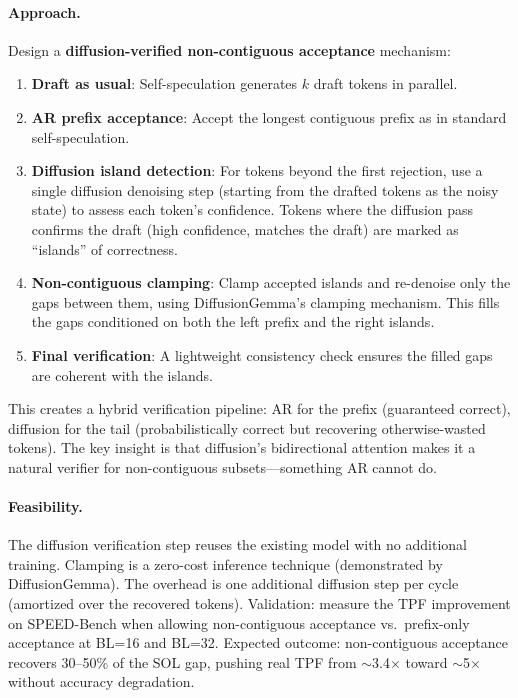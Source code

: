 \documentclass[11pt,a4paper]{article}
\begin{document}
\paragraph{Approach.} Design a \textbf{diffusion-verified non-contiguous acceptance} mechanism:
\begin{enumerate}
\item \textbf{Draft as usual}: Self-speculation generates $k$ draft tokens in parallel.
\item \textbf{AR prefix acceptance}: Accept the longest contiguous prefix as in standard self-speculation.
\item \textbf{Diffusion island detection}: For tokens beyond the first rejection, use a single diffusion denoising step (starting from the drafted tokens as the noisy state) to assess each token's confidence. Tokens where the diffusion pass confirms the draft (high confidence, matches the draft) are marked as ``islands'' of correctness.
\item \textbf{Non-contiguous clamping}: Clamp accepted islands and re-denoise only the gaps between them, using DiffusionGemma's clamping mechanism. This fills the gaps conditioned on both the left prefix and the right islands.
\item \textbf{Final verification}: A lightweight consistency check ensures the filled gaps are coherent with the islands.
\end{enumerate}
This creates a hybrid verification pipeline: AR for the prefix (guaranteed correct), diffusion for the tail (probabilistically correct but recovering otherwise-wasted tokens). The key insight is that diffusion's bidirectional attention makes it a natural verifier for non-contiguous subsets---something AR cannot do.

\paragraph{Feasibility.} The diffusion verification step reuses the existing model with no additional training. Clamping is a zero-cost inference technique (demonstrated by DiffusionGemma). The overhead is one additional diffusion step per cycle (amortized over the recovered tokens). Validation: measure the TPF improvement on SPEED-Bench when allowing non-contiguous acceptance vs.\ prefix-only acceptance at BL=16 and BL=32. Expected outcome: non-contiguous acceptance recovers 30--50\% of the SOL gap, pushing real TPF from $\sim$3.4$\times$ toward $\sim$5$\times$ without accuracy degradation.
\end{document}
